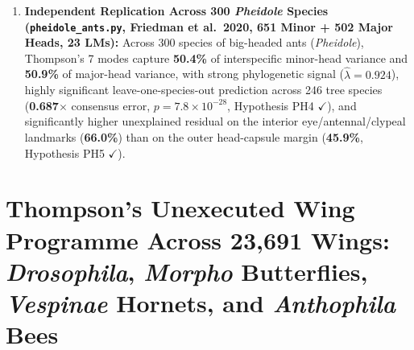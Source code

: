 \documentclass[10pt,twocolumn]{article}
\begin{document}
\begin{enumerate}
  \item \textbf{Independent Replication Across 300 \emph{Pheidole} Species (\texttt{pheidole\_ants.py}, Friedman et al.\ 2020, 651 Minor + 502 Major Heads, 23 LMs):} Across 300 species of big-headed ants (\emph{Pheidole}), Thompson's 7 modes capture \textbf{50.4\%} of interspecific minor-head variance and \textbf{50.9\%} of major-head variance, with strong phylogenetic signal ($\hat{\lambda} = 0.924$), highly significant leave-one-species-out prediction across 246 tree species (\textbf{0.687$\times$} consensus error, $p = 7.8\times 10^{-28}$, Hypothesis PH4 $\checkmark$), and significantly higher unexplained residual on the interior eye/antennal/clypeal landmarks (\textbf{66.0\%}) than on the outer head-capsule margin (\textbf{45.9\%}, Hypothesis PH5 $\checkmark$).
\end{enumerate}

\section{Thompson's Unexecuted Wing Programme Across 23,691 Wings: \emph{Drosophila}, \emph{Morpho} Butterflies, \emph{Vespinae} Hornets, and \emph{Anthophila} Bees}
\end{document}
